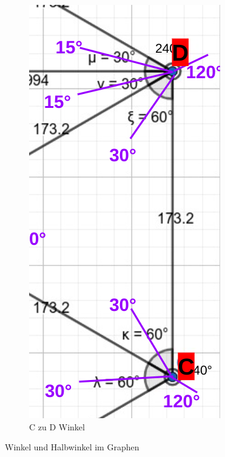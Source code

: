 \begin{figure}[H]
\begin{subfigure}{0.32\textwidth}
\includegraphics[width=0.95\linewidth]{assets/informatik-prototyp/c-d-angle-labeled.png} 
\caption{C zu D Winkel}
\label{fig:excerpt-angled-graph}
\end{subfigure}
\caption{Winkel und Halbwinkel im Graphen}
\label{fig:angles}
\end{figure}


